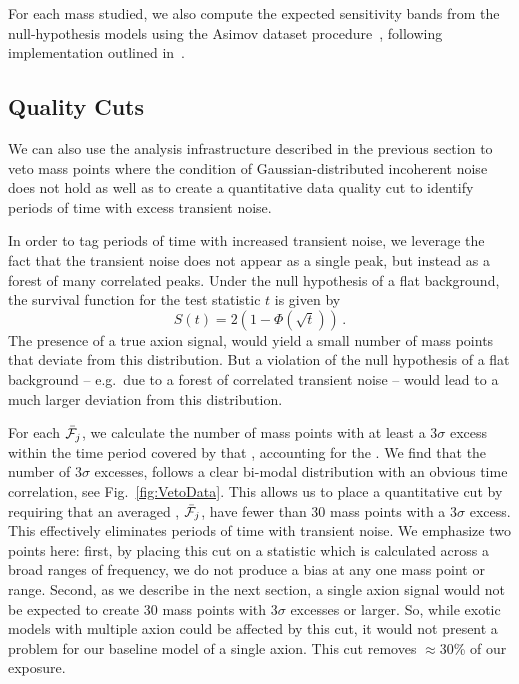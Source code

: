 \documentclass[aps,prd,amsmath,amssymb,reprint,superscriptaddress, nofootinbib,
]{revtex4-1}
\begin{document}
For each mass studied, we also compute the expected sensitivity bands from the null-hypothesis models using the Asimov dataset procedure~\cite{Cowan:2010js}, following implementation outlined in~\cite{Foster2018}.

\subsection{Quality Cuts}
\label{sec:QualityCuts}

We can also use the analysis infrastructure described in the previous section to veto mass points where the condition of Gaussian-distributed incoherent noise does not hold as well as to create a quantitative data quality cut to identify periods of time with excess transient noise. 

In order to tag periods of time with increased transient noise, we leverage the fact that the transient noise does not appear as a single peak, but instead as a forest of many correlated peaks. Under the null hypothesis of a flat background, the survival function for the test statistic $t$ is given by
\begin{equation}\label{eq:Survival}
S(t) = 2\left(1 - \Phi\left(\sqrt{t}\right)\right)\,.
\end{equation}
The presence of a true axion signal, would yield a small number of mass points that deviate from this distribution. But a violation of the null hypothesis of a flat background -- e.g.\ due to a forest of correlated transient noise -- would lead to a much larger deviation from this distribution. 

For each $\bar{\mathcal{F}}_j$, we calculate the number of mass points with at least a $3\sigma$ excess within the time period covered by that \PSD, accounting for the \LEE. We find that the number of $3\sigma$ excesses, follows a clear bi-modal distribution with an obvious time correlation, see Fig.~\ref{fig:VetoData}. This allows us to place a quantitative cut by requiring that an averaged \PSD, $\bar{\mathcal{F}}_j$, have fewer than 30 mass points with a 3$\sigma$ excess. This effectively eliminates periods of time with transient noise. We emphasize two points here: first, by placing this cut on a statistic which is calculated across a broad ranges of frequency, we do not produce a bias at any one mass point or range. Second, as we describe in the next section, a single axion signal would not be expected to create 30 mass points with $3\sigma$ excesses or larger. So, while exotic models with multiple axion could be affected by this cut, it would not present a problem for our baseline model of a single axion. This cut removes $\approx30$\% of our exposure.
\end{document}
